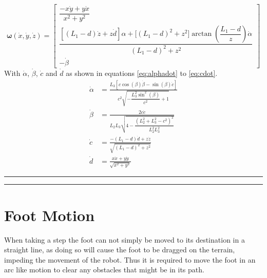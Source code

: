     \begin{equation}\label{eq:rate}
        \boldsymbol{\omega}(\dot{x}, \dot{y}, \dot{z}) =
                            \begin{bmatrix}
                                \dfrac{- x\dot{y} + y \dot{x}}{x^2 + y^2}\\[0.5cm]
                                \dfrac{\left[(L_1 - d)\dot{z} + z\dot{d}\right]\alpha + \Big[(L_1 - d)^2 + z^2\Big]\arctan{\left(\dfrac{L_1-d}{z}\right)}\dot{\alpha}}{(L_1 - d)^2 + z^2}\\[0.8cm]
                                -\dot{\beta} 
                            \end{bmatrix}
    \end{equation}
    With \(\dot\alpha\), \(\dot\beta\), \(\dot{c}\) and \(\dot{d}\) as shown in equations \ref{eq:alphadot} to \ref{eq:cdot}.
    \begin{align}
        \dot{\alpha} &= \frac{ L_3\left[ c\cos(\beta)\dot{\beta} - \sin(\beta)\dot{c} \right] }{ c^2\sqrt{-\dfrac{L_3^2\sin^2(\beta)}{c^2}+1} } \label{eq:alphadot} \\[0.5cm] 
        \dot{\beta} &= \frac{ 2c\dot{c} }{ L_2L_3\sqrt{4 - \dfrac{(L_2^2+L_3^2-c^2)^2}{L_2^2L_3^2}} } \label{eq:betadot} \\[0.5cm]
        \dot{c} &= \frac{-(L_1 - d)\dot{d} + z\dot{z}}{\sqrt{(L_1 - d)^2 + z^2}} \label{eq:bdot} \\[0.5cm]
        \dot{d} &= \frac{x\dot{x} + y\dot{y}}{\sqrt{x^2 + y^2}} \label{eq:cdot}
    \end{align}
    
    \bigskip
    \hrule
    \smallbreak
    \hrule

\newpage
\section{Foot Motion} \label{sec:arc_generation}
    When taking a step the foot can not simply be moved to its destination in a straight line, as doing so will cause the foot to be dragged on the terrain,
    impeding the movement of the robot. Thus it is required to move the foot in an arc like motion to clear any obstacles that might be in its path.


